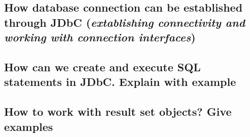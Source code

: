 \documentclass[11pt, a4paper]{book}
\begin{document}
\subsection{How database connection can be established through JDbC (\emph{extablishing connectivity and working with connection interfaces})}
\subsection{How can we create and execute SQL statements in JDbC. Explain with example}
\subsection{How to work with result set objects? Give examples}



\end{document}
